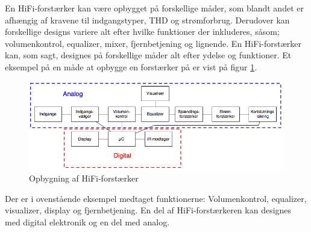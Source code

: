 En HiFi-forstærker kan være opbygget på forskellige måder, som blandt andet er afhængig af kravene til indgangstyper, THD og strømforbrug. Derudover kan forskellige designs variere alt efter hvilke funktioner der inkluderes, såsom; volumenkontrol, equalizer, mixer, fjernbetjening og lignende. 
En HiFi-forstærker kan, som sagt, designes på forskellige måder alt efter ydelse og funktioner. Et eksempel på en måde at opbygge en forstærker på er vist på figur \ref{fig:forstaerker_opbygning}.

\begin{figure}[h]
\centering
\includegraphics[scale=.6]{indledende_analyse/generel_effektforstaerker/forstaerker_opbygning.png}
\caption{Opbygning af HiFi-forstærker}
\label{fig:forstaerker_opbygning}
\end{figure}

Der er i ovenstående eksempel medtaget funktionerne: Volumenkontrol, equalizer, visualizer, display og fjernbetjening. En del af HiFi-forstærkeren kan designes med digital elektronik og en del med analog. 